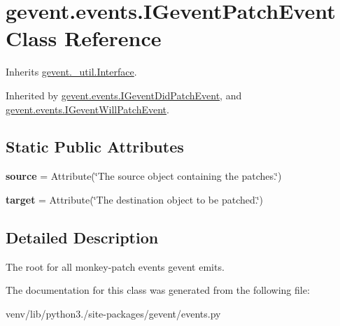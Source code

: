 \hypertarget{classgevent_1_1events_1_1_i_gevent_patch_event}{}\section{gevent.\+events.\+I\+Gevent\+Patch\+Event Class Reference}
\label{classgevent_1_1events_1_1_i_gevent_patch_event}


Inherits \hyperlink{classgevent_1_1__util_1_1_interface}{gevent.\+\_\+util.\+Interface}.



Inherited by \hyperlink{classgevent_1_1events_1_1_i_gevent_did_patch_event}{gevent.\+events.\+I\+Gevent\+Did\+Patch\+Event}, and \hyperlink{classgevent_1_1events_1_1_i_gevent_will_patch_event}{gevent.\+events.\+I\+Gevent\+Will\+Patch\+Event}.

\subsection*{Static Public Attributes}
\begin{DoxyCompactItemize}
\item 
\mbox{\label{classgevent_1_1events_1_1_i_gevent_patch_event_abccbef9189023d05130b679d375c4b9d}} 
{\bfseries source} = Attribute(\char`\"{}The source object containing the patches.\char`\"{})
\item 
\mbox{\label{classgevent_1_1events_1_1_i_gevent_patch_event_a700ec73319ffafdb0cd9a21d39fb63c4}} 
{\bfseries target} = Attribute(\char`\"{}The destination object to be patched.\char`\"{})
\end{DoxyCompactItemize}


\subsection{Detailed Description}
\begin{DoxyVerb}The root for all monkey-patch events gevent emits.
\end{DoxyVerb}
 

The documentation for this class was generated from the following file\+:\begin{DoxyCompactItemize}
\item 
venv/lib/python3./site-\/packages/gevent/events.\+py\end{DoxyCompactItemize}
